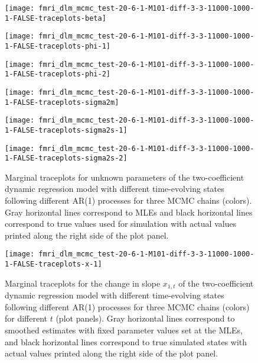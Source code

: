 \documentclass{article}
\begin{document}
\begin{figure}[ht]
\begin{minipage}{0.5\linewidth}
\texttt{[image: fmri\_dlm\_mcmc\_test-20-6-1-M101-diff-3-3-11000-1000-1-FALSE-traceplots-beta]}
\end{minipage}
\begin{minipage}{0.5\linewidth}
\texttt{[image: fmri\_dlm\_mcmc\_test-20-6-1-M101-diff-3-3-11000-1000-1-FALSE-traceplots-phi-1]}
\end{minipage}
\begin{minipage}{0.5\linewidth}
\texttt{[image: fmri\_dlm\_mcmc\_test-20-6-1-M101-diff-3-3-11000-1000-1-FALSE-traceplots-phi-2]}
\end{minipage}
\begin{minipage}{0.5\linewidth}
\texttt{[image: fmri\_dlm\_mcmc\_test-20-6-1-M101-diff-3-3-11000-1000-1-FALSE-traceplots-sigma2m]}
\end{minipage}
\begin{minipage}{0.5\linewidth}
\texttt{[image: fmri\_dlm\_mcmc\_test-20-6-1-M101-diff-3-3-11000-1000-1-FALSE-traceplots-sigma2s-1]}
\end{minipage}
\begin{minipage}{0.5\linewidth}
\texttt{[image: fmri\_dlm\_mcmc\_test-20-6-1-M101-diff-3-3-11000-1000-1-FALSE-traceplots-sigma2s-2]}
\end{minipage}
\caption{Marginal traceplots for unknown parameters of the two-coefficient dynamic regression model with different time-evolving states following different AR(1) processes for three MCMC chains (colors). Gray horizontal lines correspond to MLEs and black horizontal lines correspond to true values used for simulation with actual values printed along the right side of the plot panel.} \label{fig:tracetheta-drdiff}
\end{figure}

\begin{figure}[ht]
\texttt{[image: fmri\_dlm\_mcmc\_test-20-6-1-M101-diff-3-3-11000-1000-1-FALSE-traceplots-x-1]}
\caption{Marginal traceplots for the change in slope $x_{1,t}$ of the two-coefficient dynamic regression model with different time-evolving states following different AR(1) processes for three MCMC chains (colors) for different $t$ (plot panels). Gray horizontal lines correspond to smoothed estimates with fixed parameter values set at the MLEs, and black horizontal lines correspond to true simulated states with actual values printed along the right side of the plot panel.} \label{fig:tracex-drdiff1}
\end{figure}
\end{document}
